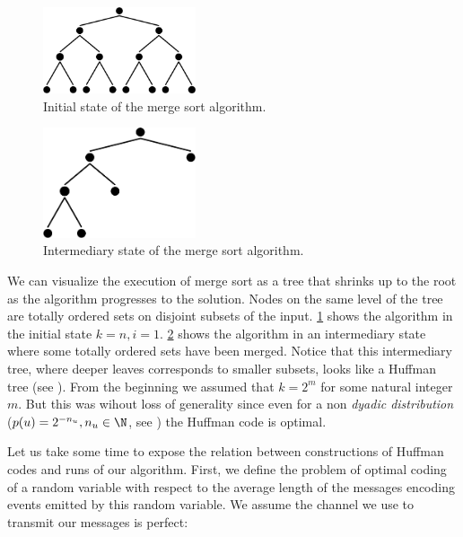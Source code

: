 \begin{figure}
	\centering
	\includegraphics[width=0.4\textwidth]{fig/merging/huffman-1-trim}
	\caption{Initial state of the merge sort algorithm.}
	\label{tree:merging:fig/huffman-1}
\end{figure}

\begin{figure}
	\centering
	\includegraphics[width=0.4\textwidth, bb= 0mm 0mm 131mm 74mm]{fig/merging/huffman-3-trim}
	\caption{Intermediary state of the merge sort algorithm.}
	\label{tree:merging:fig/huffman-3}
\end{figure}

We can visualize the execution of merge sort as a tree that shrinks up to the
root as the algorithm progresses to the solution. Nodes on the same level of
the tree are totally ordered sets on disjoint subsets of the input.
\ref{tree:merging:fig/huffman-1} shows the algorithm in the initial state $k =
n, i = 1$. \ref{tree:merging:fig/huffman-3} shows the algorithm in an
intermediary state where some totally ordered sets have been merged. Notice
that this intermediary tree, where deeper leaves corresponds to smaller
subsets, looks like a Huffman tree (see \cite{huffman1952method}). From the
beginning we assumed that $k = 2^m$ for some natural integer $m$. But this was
wihout loss of generality since even for a non \emph{dyadic distribution}
($p(u) = 2^{-n_u}, n_u \in \N$, see \cite{cover2012elements}) the Huffman code
is optimal.

Let us take some time to expose the relation between constructions of Huffman
codes and runs of our algorithm. First, we define the problem of optimal
coding of a random variable with respect to the average length of the messages
encoding events emitted by this random variable. We assume the channel we
use to transmit our messages is perfect:

